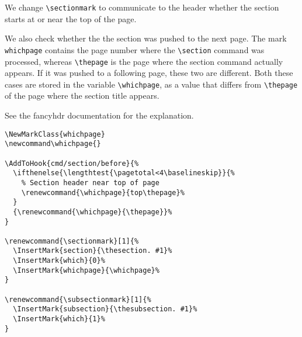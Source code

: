 \documentclass{article}
\newcommand\whichpage{}
\renewcommand{\whichpage}{top\thepage}%
\renewcommand{\sectionmark}[1]{%
  \InsertMark{section}{\thesection. #1}%
  \InsertMark{which}{0}%
  \InsertMark{whichpage}{\whichpage}%
}
\renewcommand{\subsectionmark}[1]{%
  \InsertMark{subsection}{\thesubsection. #1}%
  \InsertMark{which}{1}%
}
\begin{document}
\noindent
\begin{boxedminipage}{\textwidth}
We change \verb|\sectionmark| to communicate to the header whether the section starts at or near the top of the page.

We also check whether the the section was pushed to the next page.
The mark \texttt{whichpage} contains the page number where the \verb|\section|
command was processed, whereas \verb|\thepage| is the page where the section
command actually appears. If it was pushed to a following page, these two are different.
Both these cases are stored in the variable \verb|\whichpage|, as a value that differs from \verb|\thepage| of the page where the section title appears.

See the \textsf{fancyhdr} documentation for the explanation.

\begin{verbatim}
\NewMarkClass{whichpage}
\newcommand\whichpage{}

\AddToHook{cmd/section/before}{%
  \ifthenelse{\lengthtest{\pagetotal<4\baselineskip}}{%
    % Section header near top of page
    \renewcommand{\whichpage}{top\thepage}%
  }
  {\renewcommand{\whichpage}{\thepage}}%
}

\renewcommand{\sectionmark}[1]{%
  \InsertMark{section}{\thesection. #1}%
  \InsertMark{which}{0}%
  \InsertMark{whichpage}{\whichpage}%
}

\renewcommand{\subsectionmark}[1]{%
  \InsertMark{subsection}{\thesubsection. #1}%
  \InsertMark{which}{1}%
}
\end{verbatim}
\end{boxedminipage}
\end{document}
